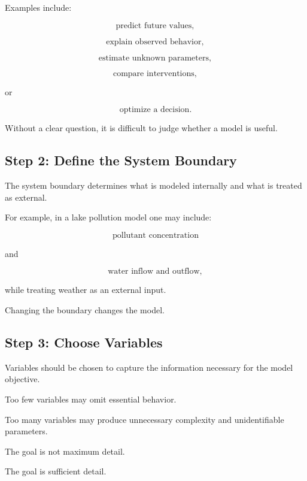 Examples include:

\[
\boxed{
\text{predict future values},
}
\]

\[
\boxed{
\text{explain observed behavior},
}
\]

\[
\boxed{
\text{estimate unknown parameters},
}
\]

\[
\boxed{
\text{compare interventions},
}
\]

or

\[
\boxed{
\text{optimize a decision}.
}
\]

Without a clear question, it is difficult to judge whether a model is useful.

\subsection{Step 2: Define the System Boundary}
\label{subsec:model-boundary}

The system boundary determines what is modeled internally and what is
treated as external.

For example, in a lake pollution model one may include:

\[
\boxed{
\text{pollutant concentration}
}
\]

and

\[
\boxed{
\text{water inflow and outflow},
}
\]

while treating weather as an external input.

Changing the boundary changes the model.

\subsection{Step 3: Choose Variables}
\label{subsec:model-variable-selection}

Variables should be chosen to capture the information necessary for the
model objective.

Too few variables may omit essential behavior.

Too many variables may produce unnecessary complexity and unidentifiable
parameters.

The goal is not maximum detail.

The goal is sufficient detail.

